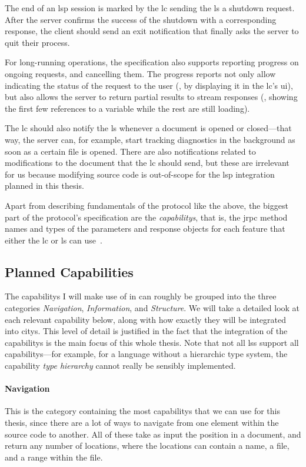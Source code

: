 \documentclass[../thesis]{subfiles}
\begin{document}
The end of an \gls{lsp} session is marked by the \gls{lc} sending the \gls{ls} a shutdown request.
After the server confirms the success of the shutdown with a corresponding response, the client should send an exit notification that finally asks the server to quit their process.

For long-running operations, the specification also supports reporting progress on ongoing requests, and cancelling them.
The progress reports not only allow indicating the status of the request to the user (\eg, by displaying it in the \gls{lc}'s \gls{ui}), but also allows the server to return partial results to stream responses (\eg, showing the first few references to a variable while the rest are still loading).

The \gls{lc} should also notify the \gls{ls} whenever a document is opened or closed---that way, the server can, for example, start tracking diagnostics in the background as soon as a certain file is opened.
There are also notifications related to modifications to the document that the \gls{lc} should send, but these are irrelevant for us because modifying source code is out-of-scope for the \gls{lsp} integration planned in this thesis.

Apart from describing fundamentals of the protocol like the above, the biggest part of the protocol's specification are the \emph{\glspl{capability}}, that is, the \gls{jrpc} method names and types of the parameters and response objects for each feature that either the \gls{lc} or \gls{ls} can use~\cite{lsp}.

\subsection{Planned Capabilities}\label{subsec:capabilities}
The \glspl{capability} I will make use of in \SEE{} can roughly be grouped into the three categories \emph{Navigation}, \emph{Information}, and \emph{Structure}.
We will take a detailed look at each relevant \gls{capability} below, along with how exactly they will be integrated into \glspl{city}.
This level of detail is justified in the fact that the integration of the \glspl{capability} is the main focus of this whole thesis.
Note that not all \glspl{ls} support all \glspl{capability}---for example, for a language without a hierarchic type system, the \gls{capability} \emph{type hierarchy} cannot really be sensibly implemented.

\paragraph{Navigation}
This is the category containing the most \glspl{capability} that we can use for this thesis, since there are a lot of ways to navigate from one element within the source code to another.
All of these take as input the position in a document, and return any number of locations, where the locations can contain a name, a file, and a \gls{range} within the file.
\end{document}
